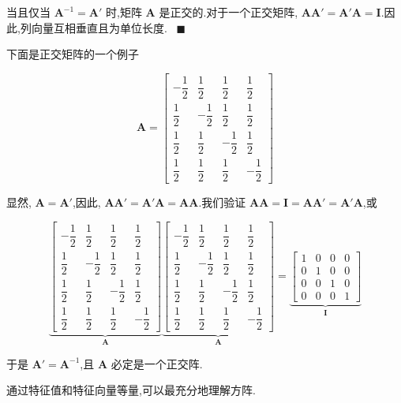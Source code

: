 
\quad 当且仅当 $\bm{A}^{-1} = \bm{A}'$ 时,矩阵 $\bm{A}$ 是正交的.对于一个正交矩阵, $\bm{A}\bm{A}' = \bm{A}'\bm{A} = \bm{I}$.因此,列向量互相垂直且为单位长度. \ $\blacksquare$

下面是正交矩阵的一个例子

\[
\bm{A} = \begin{bmatrix}
-\dfrac{1}{2} & \dfrac{1}{2} & \dfrac{1}{2} & \dfrac{1}{2} \\[3mm]
\dfrac{1}{2} & -\dfrac{1}{2} & \dfrac{1}{2} & \dfrac{1}{2} \\[3mm]
\dfrac{1}{2} & \dfrac{1}{2} & -\dfrac{1}{2} & \dfrac{1}{2} \\[3mm]
\dfrac{1}{2} & \dfrac{1}{2} & \dfrac{1}{2} & -\dfrac{1}{2}
\end{bmatrix}
\]

显然, $\bm{A} = \bm{A}'$,因此, $\bm{A}\bm{A}' = \bm{A}'\bm{A} = \bm{A}\bm{A}$.我们验证 $\bm{A}\bm{A} = \bm{I} = \bm{A}\bm{A}' = \bm{A}'\bm{A}$,或

\[
\underbrace{\begin{bmatrix}
-\dfrac{1}{2} & \dfrac{1}{2} & \dfrac{1}{2} & \dfrac{1}{2} \\[3mm]
\dfrac{1}{2} & -\dfrac{1}{2} & \dfrac{1}{2} & \dfrac{1}{2} \\[3mm]
\dfrac{1}{2} & \dfrac{1}{2} & -\dfrac{1}{2} & \dfrac{1}{2} \\[3mm]
\dfrac{1}{2} & \dfrac{1}{2} & \dfrac{1}{2} & -\dfrac{1}{2}
\end{bmatrix}}_{\bm{A}}
\underbrace{\begin{bmatrix}
-\dfrac{1}{2} & \dfrac{1}{2} & \dfrac{1}{2} & \dfrac{1}{2} \\[3mm]
\dfrac{1}{2} & -\dfrac{1}{2} & \dfrac{1}{2} & \dfrac{1}{2} \\[3mm]
\dfrac{1}{2} & \dfrac{1}{2} & -\dfrac{1}{2} & \dfrac{1}{2} \\[3mm]
\dfrac{1}{2} & \dfrac{1}{2} & \dfrac{1}{2} & -\dfrac{1}{2}
\end{bmatrix}}_{\bm{A}}
=
\underbrace{\begin{bmatrix} 1 & 0 & 0 & 0 \\ 0 & 1 & 0 & 0 \\ 0 & 0 & 1 & 0 \\ 0 & 0 & 0 & 1 \end{bmatrix}}_{\bm{I}}
\]

于是 $\bm{A}' = \bm{A}^{-1}$,且 $\bm{A}$ 必定是一个正交阵.

通过特征值和特征向量等量,可以最充分地理解方阵.

